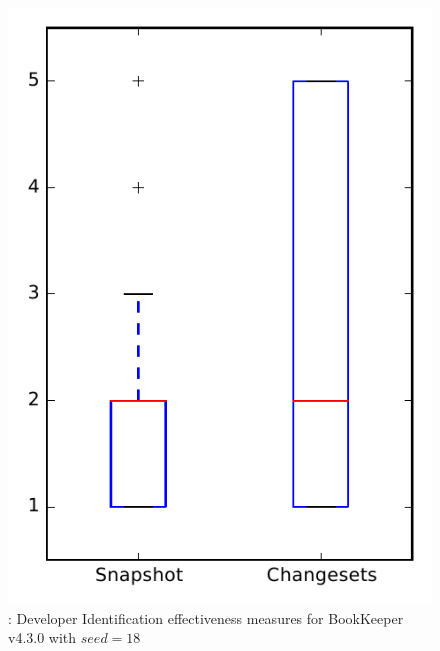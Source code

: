 
\begin{figure}
\centering
\includegraphics[height=0.4\textheight]{figures/dit_seed/rq1_bookkeeper_18}
\caption{\rtwo: Developer Identification effectiveness measures for BookKeeper v4.3.0 with $seed=18$}
\label{fig:dit_seed:rq1:bookkeeper}
\end{figure}
